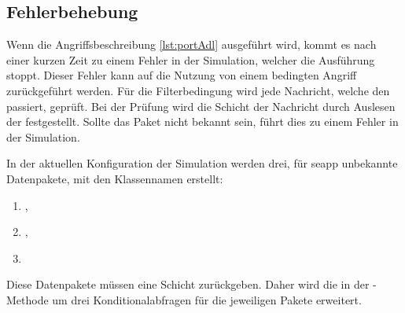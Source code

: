 \subsection{Fehlerbehebung}
Wenn die Angriffsbeschreibung \ref{lst:portAdl} ausgeführt wird, kommt es nach einer kurzen Zeit zu einem Fehler in der Simulation, welcher die Ausführung stoppt. Dieser Fehler kann auf die Nutzung von einem bedingten Angriff zurückgeführt werden. Für die Filterbedingung wird jede Nachricht, welche den  passiert, geprüft. Bei der Prüfung wird die Schicht der Nachricht durch Auslesen der  festgestellt. Sollte das Paket nicht bekannt sein, führt dies zu einem Fehler in der Simulation. 

In der aktuellen Konfiguration der Simulation werden drei, für \gls{seapp} unbekannte Datenpakete, mit den Klassennamen erstellt:
\begin{enumerate}
	\item {},
	\item {},
	\item {}
\end{enumerate}

Diese Datenpakete müssen eine Schicht zurückgeben. Daher wird die  in der -Methode um drei Konditionalabfragen für die jeweiligen Pakete erweitert.    

